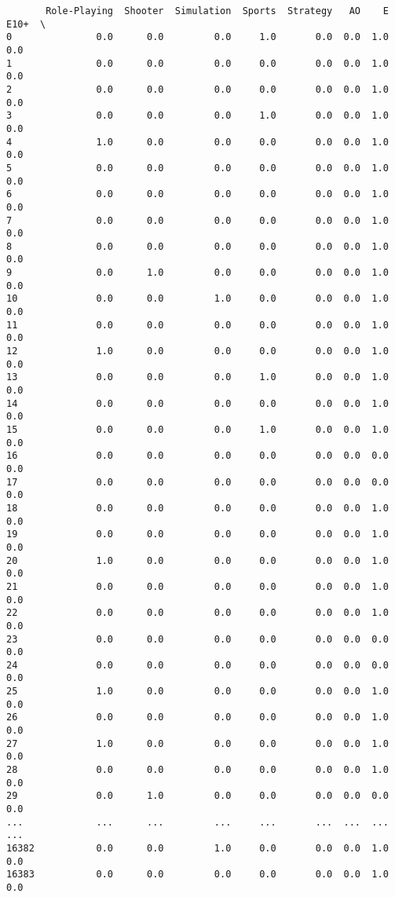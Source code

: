 \documentclass[11pt]{article}
\begin{document}
\begin{verbatim}
       Role-Playing  Shooter  Simulation  Sports  Strategy   AO    E  E10+  \
0               0.0      0.0         0.0     1.0       0.0  0.0  1.0   0.0   
1               0.0      0.0         0.0     0.0       0.0  0.0  1.0   0.0   
2               0.0      0.0         0.0     0.0       0.0  0.0  1.0   0.0   
3               0.0      0.0         0.0     1.0       0.0  0.0  1.0   0.0   
4               1.0      0.0         0.0     0.0       0.0  0.0  1.0   0.0   
5               0.0      0.0         0.0     0.0       0.0  0.0  1.0   0.0   
6               0.0      0.0         0.0     0.0       0.0  0.0  1.0   0.0   
7               0.0      0.0         0.0     0.0       0.0  0.0  1.0   0.0   
8               0.0      0.0         0.0     0.0       0.0  0.0  1.0   0.0   
9               0.0      1.0         0.0     0.0       0.0  0.0  1.0   0.0   
10              0.0      0.0         1.0     0.0       0.0  0.0  1.0   0.0   
11              0.0      0.0         0.0     0.0       0.0  0.0  1.0   0.0   
12              1.0      0.0         0.0     0.0       0.0  0.0  1.0   0.0   
13              0.0      0.0         0.0     1.0       0.0  0.0  1.0   0.0   
14              0.0      0.0         0.0     0.0       0.0  0.0  1.0   0.0   
15              0.0      0.0         0.0     1.0       0.0  0.0  1.0   0.0   
16              0.0      0.0         0.0     0.0       0.0  0.0  0.0   0.0   
17              0.0      0.0         0.0     0.0       0.0  0.0  0.0   0.0   
18              0.0      0.0         0.0     0.0       0.0  0.0  1.0   0.0   
19              0.0      0.0         0.0     0.0       0.0  0.0  1.0   0.0   
20              1.0      0.0         0.0     0.0       0.0  0.0  1.0   0.0   
21              0.0      0.0         0.0     0.0       0.0  0.0  1.0   0.0   
22              0.0      0.0         0.0     0.0       0.0  0.0  1.0   0.0   
23              0.0      0.0         0.0     0.0       0.0  0.0  0.0   0.0   
24              0.0      0.0         0.0     0.0       0.0  0.0  0.0   0.0   
25              1.0      0.0         0.0     0.0       0.0  0.0  1.0   0.0   
26              0.0      0.0         0.0     0.0       0.0  0.0  1.0   0.0   
27              1.0      0.0         0.0     0.0       0.0  0.0  1.0   0.0   
28              0.0      0.0         0.0     0.0       0.0  0.0  1.0   0.0   
29              0.0      1.0         0.0     0.0       0.0  0.0  0.0   0.0   
...             ...      ...         ...     ...       ...  ...  ...   ...   
16382           0.0      0.0         1.0     0.0       0.0  0.0  1.0   0.0   
16383           0.0      0.0         0.0     0.0       0.0  0.0  1.0   0.0   

\end{verbatim}
\end{document}
